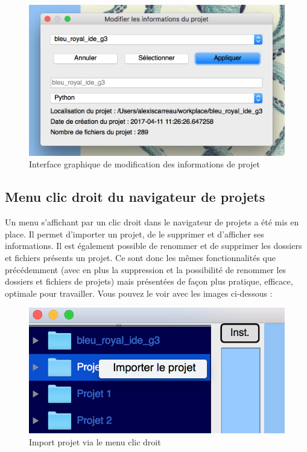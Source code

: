 \documentclass[a4paper,12pt]{article}
\begin{document}
\begin{figure}[h!]
			\begin{center}
				\includegraphics[scale=0.5]{images/imgs_projet/info_project3.png}
				\caption{Interface graphique de modification des informations de projet}
			\end{center}
		\end{figure}
		
\newpage

\subsection{Menu clic droit du navigateur de projets}

Un menu s'affichant par un clic droit dans le navigateur de projets a été mis en place. Il permet d'importer un projet, de le supprimer et d'afficher ses informations. Il est également possible de renommer et de supprimer les dossiers et fichiers présents un projet. Ce sont donc les mêmes fonctionnalités que précédemment (avec en plus la suppression et la possibilité de renommer les dossiers et fichiers de projets) mais présentées de façon plus pratique, efficace, optimale pour travailler. Vous pouvez le voir avec les images ci-dessous :


\begin{figure}[h!]
			\begin{center}
				\includegraphics[scale=0.5]{images/imgs_projet/right_click_import.png}
				\caption{Import projet via le menu clic droit}
			\end{center}
		\end{figure}
		
\end{document}
